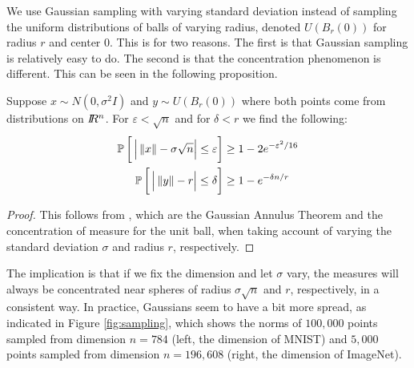 We use Gaussian sampling with varying standard deviation instead of sampling the uniform distributions of balls of varying radius, denoted $U(B_r(0))$ for radius $r$ and center $0$. This is for two reasons. The first is that Gaussian sampling is relatively easy to do. The second is that the concentration phenomenon is different. This can be seen in the following proposition.

\begin{proposition} \label{prop:concentration}
    Suppose $x \sim N(0,\sigma^2 I)$ and $y \sim U(B_r(0))$ where both points come from distributions on $I\!\!R^n$. For $\varepsilon < \sqrt{n}$ and for $\delta < r$ we find the following:
    \begin{align}
        \mathbb{P}\left[\rule{0pt}{15pt} \left| \rule{0pt}{10pt} \Norm{x} - \sigma \sqrt{n} \right| \leq \varepsilon \right] &\geq 1-2e^{-\varepsilon^2/16} \\
        \mathbb{P}\left[\rule{0pt}{15pt} \left| \rule{0pt}{10pt} \Norm{y} - r \right| \leq \delta \right] &\geq 1-e^{-\delta n/r} 
    \end{align}
\end{proposition}
\begin{proof}
    This follows from \cite[Theorems 4.7 and 3.7]{wegner2021lecture}, which are the Gaussian Annulus Theorem and the concentration of measure for the unit ball, when taking account of varying the standard deviation $\sigma$ and radius $r$, respectively.
\end{proof}

The implication is that if we fix the dimension and let $\sigma$ vary, the measures will always be concentrated near spheres of radius $\sigma \sqrt{n}$ and $r$, respectively, in a consistent way. In practice, Gaussians seem to have a bit more spread, as indicated in Figure \ref{fig:sampling}, which shows the norms of $100,000$ points sampled from dimension $n=784$ (left, the dimension of MNIST) and $5,000$ points sampled from dimension $n=196,608$ (right, the dimension of ImageNet).

